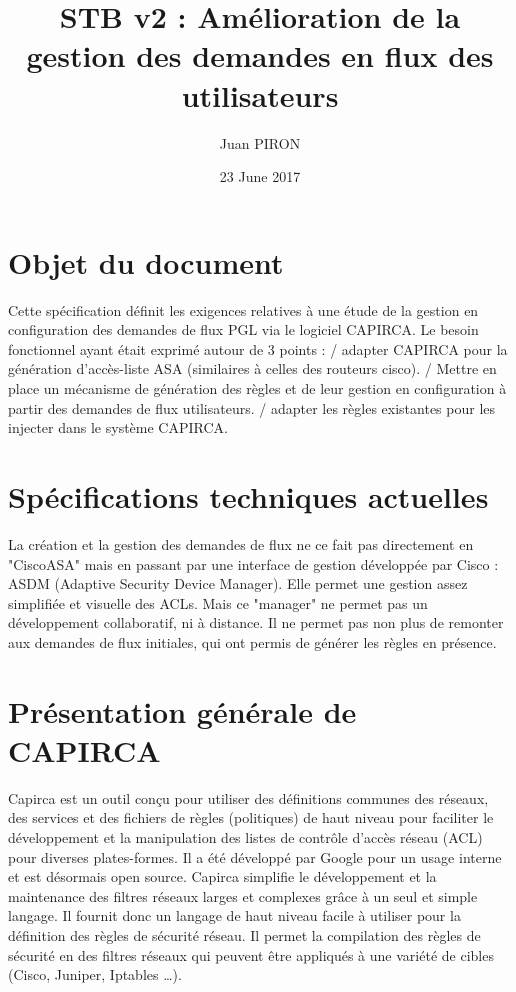 \documentclass{article}
\title{STB v2 : Amélioration de la gestion des demandes en flux des utilisateurs}
\author{Juan PIRON}
\date{23 June 2017}
\begin{document}
\maketitle
\section{Objet du document}

Cette spécification définit les exigences relatives à une étude de la gestion en configuration des demandes de flux PGL via le logiciel CAPIRCA. Le besoin fonctionnel ayant était exprimé autour de 3 points :
/ adapter CAPIRCA pour la génération d’accès-liste ASA (similaires à celles des routeurs cisco).
/ Mettre en place un mécanisme de génération des règles et de leur gestion en configuration à partir des demandes de flux utilisateurs.
/ adapter les règles existantes pour les injecter dans le système CAPIRCA.

\maketitle
\section{Spécifications techniques actuelles}

La création et la gestion des demandes de flux ne ce fait pas directement en "CiscoASA" mais en passant par une interface de gestion développée par Cisco : ASDM (Adaptive Security Device Manager). Elle permet une gestion assez simplifiée et visuelle des ACLs. Mais ce "manager" ne permet pas un développement collaboratif, ni à distance. Il ne permet pas non plus de remonter aux demandes de flux initiales, qui ont permis de générer les règles en présence.

\maketitle
\section{Présentation générale de CAPIRCA}

Capirca est un outil conçu pour utiliser des définitions communes des réseaux, des services et des fichiers de règles (politiques) de haut niveau pour faciliter le développement et la manipulation des listes de contrôle d'accès réseau (ACL) pour diverses plates-formes. Il a été développé par Google pour un usage interne et est désormais open source.
Capirca simplifie le développement et la maintenance des filtres réseaux larges et complexes grâce à un seul et simple langage. Il fournit donc un langage de haut niveau facile à utiliser pour la définition des règles de sécurité réseau. Il permet la compilation des règles de sécurité en des filtres réseaux qui peuvent être appliqués à une variété de cibles (Cisco, Juniper, Iptables …).
\end{document}
